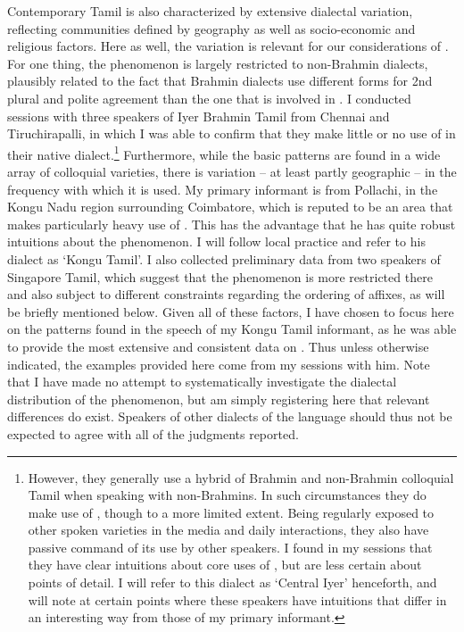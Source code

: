 \documentclass[output=paper, modfonts, nonflat]{langsci/langscibook}
\begin{document}
Contemporary Tamil is also characterized by extensive dialectal
variation, reflecting communities defined by geography as well as
socio-economic and religious factors. Here as well, the variation is
relevant for our considerations of \allagr. For one thing, the
phenomenon is largely restricted to non-Brahmin dialects, plausibly
related to the fact that Brahmin dialects use different forms for 2nd
plural and polite agreement than the one that is involved in
\allagr. I conducted sessions with three speakers of Iyer Brahmin
Tamil from Chennai and Tiruchirapalli, in which I was able to confirm
that they make little or no use of \allagr{} in their native
dialect.\footnote{However, they generally use a hybrid of Brahmin and
  non-Brahmin colloquial Tamil when speaking with non-Brahmins. In
  such circumstances they do make use of \allagr, though to a more
  limited extent. Being regularly exposed to other spoken varieties in
  the media and daily interactions, they also have passive command of
  its use by other speakers. I found in my sessions that they have
  clear intuitions about core uses of \allagr, but are less certain
  about points of detail. I will refer to this dialect as `Central
  Iyer' henceforth, and will note at certain points where these
  speakers have intuitions that differ in an interesting way from
  those of my primary informant.}  Furthermore, while the basic
\allagr{} patterns are found in a wide array of colloquial varieties,
there is variation -- at least partly geographic -- in the frequency
with which it is used. My primary informant is from Pollachi, in the
Kongu Nadu region surrounding Coimbatore, which is reputed to be an
area that makes particularly heavy use of \allagr. This has the
advantage that he has quite robust intuitions about the phenomenon. I
will follow local practice and refer to his dialect as `Kongu
Tamil'. I also collected preliminary data from two speakers of
Singapore Tamil, which suggest that the phenomenon is more restricted
there and also subject to different constraints regarding the ordering
of affixes, as will be briefly mentioned below.  Given all of these
factors, I have chosen to focus here on the patterns found in the
speech of my Kongu Tamil informant, as he was able to provide the most
extensive and consistent data on \allagr. Thus unless otherwise
indicated, the examples provided here come from my sessions with
him. Note that I have made no attempt to systematically investigate
the dialectal distribution of the phenomenon, but am simply
registering here that relevant differences do exist.  Speakers of
other dialects of the language should thus not be expected to agree
with all of the judgments reported.
\end{document}
